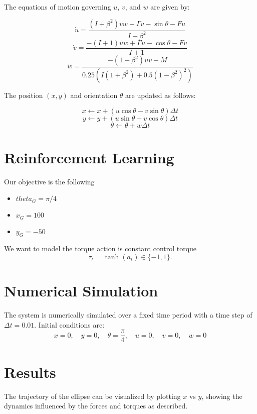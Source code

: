 \documentclass{article}
\begin{document}
The equations of motion governing \( u \), \( v \), and \( w \) are given by:

\[
\dot{u} = \frac{(I + \beta^2) v w - \Gamma v - \sin \theta - Fu}{I + \beta^2}
\]
\[
\dot{v} = \frac{-(I + 1) u w + \Gamma u - \cos \theta - Fv}{I + 1}
\]
\[
\dot{w} = \frac{-(1 - \beta^2) u v - M}{0.25 \left( I (1 + \beta^2) + 0.5 (1 - \beta^2)^2 \right)}
\]

The position \( (x, y) \) and orientation \( \theta \) are updated as follows:

\[
x \leftarrow x + (u \cos \theta - v \sin \theta) \Delta t
\]
\[
y \leftarrow y + (u \sin \theta + v \cos \theta) \Delta t
\]
\[
\theta \leftarrow \theta + w \Delta t
\]

\section{Reinforcement Learning}
Our objective is the following 
\begin{itemize}
    \item $theta_G = \pi/4$
    \item $x_G = 100$
    \item $y_G = -50$
\end{itemize}
We want to model the torque action is constant control torque
$$
\tau_t = \tanh(a_t) \in \{-1, 1\}.
$$



\section*{Numerical Simulation}

The system is numerically simulated over a fixed time period with a time step of \( \Delta t = 0.01 \). Initial conditions are:
\[
x = 0, \quad y = 0, \quad \theta = \frac{\pi}{4}, \quad u = 0, \quad v = 0, \quad w = 0
\]

\section*{Results}

The trajectory of the ellipse can be visualized by plotting \( x \) vs \( y \), showing the dynamics influenced by the forces and torques as described.
\end{document}
